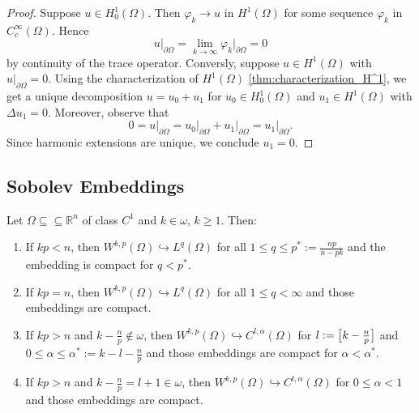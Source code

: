 \begin{proof}
	Suppose $u \in H^1_0(\Omega)$. Then $\varphi_k \to u$ in $H^1(\Omega)$ for some sequence $\varphi_k$ in $C^\infty_c(\Omega)$. Hence
	\begin{equation*}
		u\vert_{\partial \Omega} = \lim_{k \to \infty} \varphi_k\vert_{\partial\Omega} = 0
	\end{equation*}
	\noindent by continuity of the trace operator. Conversly, suppose $u \in H^1(\Omega)$ with $u\vert_{\partial \Omega} = 0$. Using the characterization of $H^1(\Omega)$ \ref{thm:characterization_H^1}, we get a unique decomposition $u = u_0 + u_1$ for $u_0 \in H^1_0(\Omega)$ and $u_1 \in H^1(\Omega)$ with $\Delta u_1 = 0$. Moreover, observe that
	\begin{equation*}
		0 = u\vert_{\partial \Omega} = u_0\vert_{\partial\Omega} + u_1\vert_{\partial \Omega} = u_1\vert_{\partial \Omega}.
	\end{equation*}
	Since harmonic extensions are unique, we conclude $u_1 = 0$.
\end{proof}

\subsection*{Sobolev Embeddings}

\begin{theorem}
	\label{thm:Sobolev_embedding_theorem}
	Let $\Omega \subseteq \subseteq \mathbb{R}^n$ of class $C^1$ and $k \in \omega$, $k \geq 1$. Then:
	\begin{enumerate}[label = \textup{(}\alph*\textup{)},wide = 0pt]
		\item If $kp < n$, then $W^{k,p}(\Omega) \hookrightarrow L^q(\Omega)$ for all $1 \leq q \leq p^* := \frac{np}{n - pk}$ and the embedding is compact for $q < p^*$.
		\item If $kp = n$, then $W^{k,p}(\Omega) \hookrightarrow L^q(\Omega)$ for all $1 \leq q < \infty$ and those embeddings are compact.
		\item If $kp > n$ and $k - \frac{n}{p} \notin \omega$, then $W^{k,p}(\Omega) \hookrightarrow C^{l,\alpha}(\Omega)$ for $l := \sbr[1]{k - \frac{n}{p}}$ and $0 \leq \alpha \leq \alpha^* := k - l - \frac{n}{p}$ and those embeddings are compact for $\alpha < \alpha^*$.
		\item If $kp > n$ and $k - \frac{n}{p} = l + 1 \in \omega$, then $W^{k,p}(\Omega) \hookrightarrow C^{l,\alpha}(\Omega)$ for $0 \leq \alpha < 1$ and those embeddings are compact.
	\end{enumerate}
\end{theorem}

